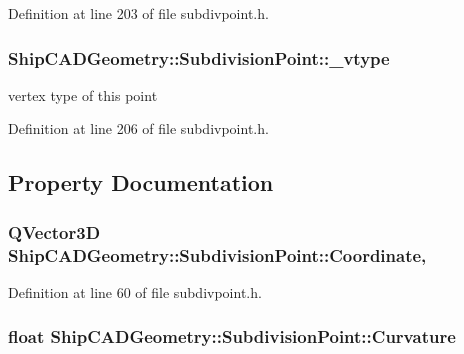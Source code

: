 Definition at line 203 of file subdivpoint.\-h.

\hypertarget{classShipCADGeometry_1_1SubdivisionPoint_a9ffc795a56a1b963ba29725be17be266}{
\subsubsection[{\-\_\-vtype}]{ Ship\-C\-A\-D\-Geometry\-::\-Subdivision\-Point\-::\-\_\-vtype\hspace{0.3cm}{\ttfamily [protected]}}}\label{classShipCADGeometry_1_1SubdivisionPoint_a9ffc795a56a1b963ba29725be17be266}
vertex type of this point 

Definition at line 206 of file subdivpoint.\-h.



\subsection{Property Documentation}
\hypertarget{classShipCADGeometry_1_1SubdivisionPoint_a4a8b002061482e596fb9228a8968cd57}{
\subsubsection[{Coordinate}]{\setlength{\rightskip}{0pt plus 5cm}Q\-Vector3\-D Ship\-C\-A\-D\-Geometry\-::\-Subdivision\-Point\-::\-Coordinate\hspace{0.3cm}{\ttfamily [read]}, {\ttfamily [write]}}}\label{classShipCADGeometry_1_1SubdivisionPoint_a4a8b002061482e596fb9228a8968cd57}


Definition at line 60 of file subdivpoint.\-h.

\hypertarget{classShipCADGeometry_1_1SubdivisionPoint_a7ca022ae7a31b478234ee212a24e3047}{
\subsubsection[{Curvature}]{\setlength{\rightskip}{0pt plus 5cm}float Ship\-C\-A\-D\-Geometry\-::\-Subdivision\-Point\-::\-Curvature\hspace{0.3cm}{\ttfamily [read]}}}\label{classShipCADGeometry_1_1SubdivisionPoint_a7ca022ae7a31b478234ee212a24e3047}


